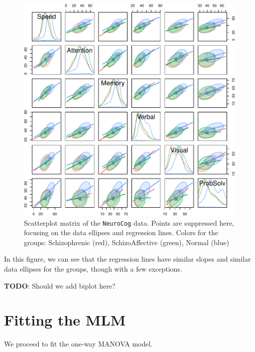 \documentclass[
  letterpaper,
  10pt,
  krantz2]{krantz}
\begin{document}
{\begin{figure}[H]
{\includegraphics[width=1\textwidth,height=\textheight]{figs/fig-NC-scatmat-1.pdf}

}

\caption{\label{fig-NC-scatmat}Scatterplot matrix of the
\texttt{NeuroCog} data. Points are suppressed here, focusing on the data
ellipses and regression lines. Colors for the groups: Schizophrenic
(red), SchizoAffective (green), Normal (blue)}

\end{figure}%

In this figure, we can see that the regression lines have similar slopes
and similar data ellipses for the groups, though with a few exceptions.

\textbf{TODO}: Should we add biplot here?

\section{Fitting the MLM}\label{fitting-the-mlm}

We proceed to fit the one-way MANOVA model.

}
\end{document}
